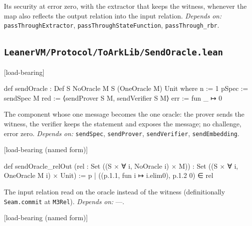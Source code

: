 
Its security at error zero, with the extractor that keeps the witness, whenever the map also reflects the output relation into the input relation. \emph{Depends on:} \texttt{passThroughExtractor}, \texttt{passThroughStateFunction}, \texttt{passThrough\_\allowbreak{}rbr}.

\subsection{\texttt{LeanerVM/Protocol/ToArkLib/SendOracle.lean}}\label{sec:gen-cat-spine-SendOracle}

\par\medskip\noindent\textbf{}\hfill\textsf{\small [load-bearing]}\par\nopagebreak

\begin{leancode}
def sendOracle : Def S NoOracle M S (OneOracle M) Unit where
  n := 1
  pSpec := sendSpec M
  red := ⟨sendProver S M, sendVerifier S M⟩
  err := fun _ ↦ 0
\end{leancode}


The component whose one message becomes the one oracle: the prover sends the witness, the verifier keeps the statement and exposes the message; no challenge, error zero. \emph{Depends on:} \texttt{sendSpec}, \texttt{sendProver}, \texttt{sendVerifier}, \texttt{sendEmbedding}.

\par\medskip\noindent\textbf{}\hfill\textsf{\small [load-bearing (named form)]}\par\nopagebreak

\begin{leancode}
def sendOracle_relOut (rel : Set ((S × ∀ i, NoOracle i) × M)) :
    Set ((S × ∀ i, OneOracle M i) × Unit) :=
  {p | ((p.1.1, fun i ↦ i.elim0), p.1.2 0) ∈ rel}
\end{leancode}


The input relation read on the oracle instead of the witness (definitionally \texttt{Seam.\allowbreak{}commit} at \texttt{M3Rel}). \emph{Depends on:} —.

\par\medskip\noindent\textbf{}\hfill\textsf{\small [load-bearing (named form)]}\par\nopagebreak

